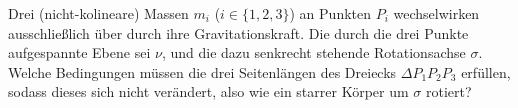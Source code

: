 \begin{minipage}[b]{0.7\textwidth}

\begin{Exercise}[label  = rotierendes 3-Körper-Problem, difficulty = 3, label = cmrot, origin = {XX. IPhO 1989}, title = Starrer Körper]
	Drei (nicht-kolineare) Massen $m_i$ ($i \in \{1,2,3\}$) an Punkten $P_i$ wechselwirken ausschließlich über durch ihre Gravitationskraft. Die durch die drei Punkte aufgespannte Ebene sei $\nu$, und die dazu senkrecht stehende Rotationsachse $\sigma$. Welche Bedingungen müssen die drei Seitenlängen des Dreiecks $\Delta P_1P_2P_3$ erfüllen, sodass dieses sich nicht verändert, also wie ein starrer Körper um $\sigma$ rotiert?
\end{Exercise}
\end{minipage}
\begin{minipage}[b]{0.3\textwidth}
	\centering
{}
\end{minipage}